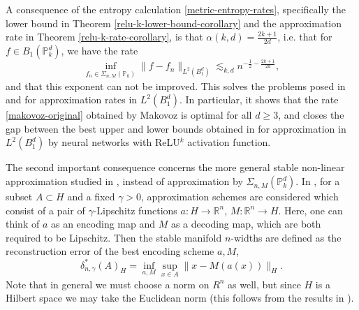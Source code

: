 A consequence of the entropy calculation \eqref{metric-entropy-rates}, specifically the lower bound in Theorem \ref{relu-k-lower-bound-corollary} and the approximation rate in Theorem \ref{relu-k-rate-corollary}, is that $\alpha(k,d) = \frac{2k+1}{2d}$, i.e. that for $f\in B_1(\mathbb{P}_k^d)$, we have the rate
\begin{equation}\label{reluk-approximation-rate}
 \inf_{f_n\in \Sigma_{n,M}(\mathbb{P}_k)} \|f - f_n\|_{L^2(B_1^d)} \lesssim_{k,d} n^{-\frac{1}{2}-\frac{2k+1}{2d}},
\end{equation}
and that this exponent can not be improved. This solves the problems posed in \cite{makovoz1996random} and \cite{klusowski2018approximation} for approximation rates in $L^2(B_1^d)$. In particular, it shows that the rate \eqref{makovoz-original} obtained by Makovoz \cite{makovoz1996random} is optimal for all $d \geq 3$, and closes the gap between the best upper and lower bounds obtained in \cite{klusowski2018approximation} for approximation in $L^2(B_1^d)$ by neural networks with ReLU$^k$ activation function.

The second important consequence concerns the more general stable non-linear approximation studied in \cite{cohen2020optimal}, instead of approximation by $\Sigma_{n,M}(\mathbb{P}^d_k)$. In \cite{cohen2020optimal}, for a subset $A\subset H$ and a fixed $\gamma > 0$, approximation schemes are considered which consist of a pair of $\gamma$-Lipschitz functions $a:H\rightarrow \mathbb{R}^n$, $M:\mathbb{R}^n\rightarrow H$. Here, one can think of $a$ as an encoding map and $M$ as a decoding map, which are both required to be Lipschitz. Then the stable manifold $n$-widths are defined as the reconstruction error of the best encoding scheme $a,M$,
\begin{equation}
 \delta^*_{n,\gamma}(A)_H = \inf_{a,M} \sup_{x\in A} \|x - M(a(x))\|_H.
\end{equation}
Note that in general we must choose a norm on $R^n$ as well, but since $H$ is a Hilbert space we may take the Euclidean norm (this follows from the results in \cite{cohen2020optimal}).

